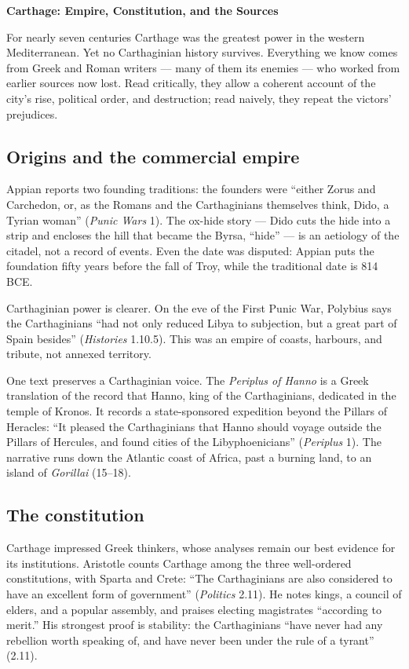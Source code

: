 \documentclass[12pt]{article}
\begin{document}
\begin{center}
{\large\bfseries Carthage: Empire, Constitution, and the Sources}
\end{center}
\vspace{1em}
For nearly seven centuries Carthage was the greatest power in the
western Mediterranean. Yet no Carthaginian history survives. Everything
we know comes from Greek and Roman writers --- many of them its enemies
--- who worked from earlier sources now lost. Read critically, they
allow a coherent account of the city's rise, political order, and
destruction; read naively, they repeat the victors' prejudices.

\subsection{Origins and the commercial empire}

Appian reports two founding traditions: the founders were ``either Zorus
and Carchedon, or, as the Romans and the Carthaginians themselves think,
Dido, a Tyrian woman'' (\emph{Punic Wars} 1). The ox-hide story --- Dido
cuts the hide into a strip and encloses the hill that became the Byrsa,
``hide'' --- is an aetiology of the citadel, not a record of events.
Even the date was disputed: Appian puts the foundation fifty years
before the fall of Troy, while the traditional date is 814 BCE.

Carthaginian power is clearer. On the eve of the First Punic War,
Polybius says the Carthaginians ``had not only reduced Libya to
subjection, but a great part of Spain besides'' (\emph{Histories}
1.10.5). This was an empire of coasts, harbours, and tribute, not
annexed territory.

One text preserves a Carthaginian voice. The \emph{Periplus of Hanno} is
a Greek translation of the record that Hanno, king of the Carthaginians,
dedicated in the temple of Kronos. It records a state-sponsored
expedition beyond the Pillars of Heracles: ``It pleased the
Carthaginians that Hanno should voyage outside the Pillars of Hercules,
and found cities of the Libyphoenicians'' (\emph{Periplus} 1). The
narrative runs down the Atlantic coast of Africa, past a burning land,
to an island of \emph{Gorillai} (15--18).

\subsection{The constitution}

Carthage impressed Greek thinkers, whose analyses remain our best
evidence for its institutions. Aristotle counts Carthage among the three
well-ordered constitutions, with Sparta and Crete: ``The Carthaginians
are also considered to have an excellent form of government''
(\emph{Politics} 2.11). He notes kings, a council of elders, and a
popular assembly, and praises electing magistrates ``according to
merit.'' His strongest proof is stability: the Carthaginians ``have
never had any rebellion worth speaking of, and have never been under the
rule of a tyrant'' (2.11).
\end{document}
